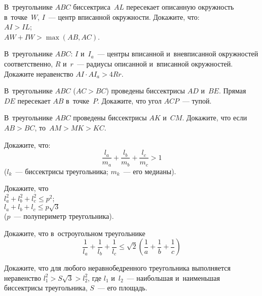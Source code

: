 


\begin{problems}

\item
В~треугольнике $ABC$ биссектриса~$AL$ пересекает описанную окружность
в~точке~$W$, $I$~--- центр вписанной окружности.
Докажите, что:
\\
\subproblem $AI > IL$;
\\
\subproblem $AW + IW > \max(AB, AC)$.

\item
В~треугольнике $ABC$: $I$ и~$I_{a}$~--- центры вписанной и~вневписанной
окружностей соответственно, $R$ и~$r$~--- радиусы описанной и~вписанной
окружностей.
Докажите неравенство $AI \cdot A I_{a} > 4 R r$.

\item
В~треугольнике $ABC$ ($AC > BC$) проведены биссектрисы $AD$ и~$BE$.
Прямая~$DE$ пересекает $AB$ в~точке~$P$.
Докажите, что угол $ACP$~--- тупой.

\item
В~треугольнике $ABC$ проведены биссектрисы $AK$ и~$CM$.
Докажите, что если $AB > BC$, то~$AM > MK > KC$.

\item
Докажите, что:
\[
    \frac{l_{a}}{m_{a}} + \frac{l_{b}}{m_{b}} + \frac{l_{c}}{m_{c}}
>
    1
\]
($l_{k}$~--- биссектрисы треугольника; $m_{k}$~--- его медианы).

\item
Докажите, что
\\
\subproblem
\(
    l_{a}^2 + l_{b}^2 + l_{c}^2
\leq
    p^2
\);
\\
\subproblem
\(
    l_{a} + l_{b} + l_{c}
\leq
    p \sqrt{3}
\)\\
($p$~--- полупериметр треугольника).

\item
Докажите, что в~остроугольном треугольнике
\[
    \frac{1}{l_{a}} + \frac{1}{l_{b}} + \frac{1}{l_{c}}
\leq
    \sqrt{2}
    \left( \frac{1}{a} + \frac{1}{b} + \frac{1}{c} \right)
\]

\item
Докажите, что для любого неравнобедренного треугольника выполняется неравенство
$l_{1}^2 > S \sqrt{3} > l_{2}^2$, где $l_{1}$ и~$l_{2}$~--- наибольшая
и~наименьшая биссектрисы треугольника, $S$~--- его площадь.


\end{problems}
